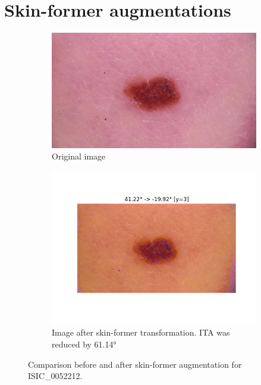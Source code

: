 \chapter{Skin-former augmentations}
\label{ap:skin_former}

\begin{figure}[ht]
    \centering
    \begin{subfigure}[b]{0.45\textwidth}
        \includegraphics[width=\linewidth]{figures/skin_former/ISIC_0052212.jpg}
        \caption{Original image}
        \label{fig:original_0052212}
    \end{subfigure}
    \hfill
    \begin{subfigure}[b]{0.45\textwidth}
        \includegraphics[width=\linewidth]{figures/skin_former/ISIC_0052212.jpg_shifted.png}
        \caption{Image after skin-former transformation. ITA was reduced by 61.14°}
        \label{fig:shifted_0052212}
    \end{subfigure}
    \caption{Comparison before and after skin-former augmentation for ISIC\_0052212.}
    \label{fig:skinformer_0052212}
\end{figure}

